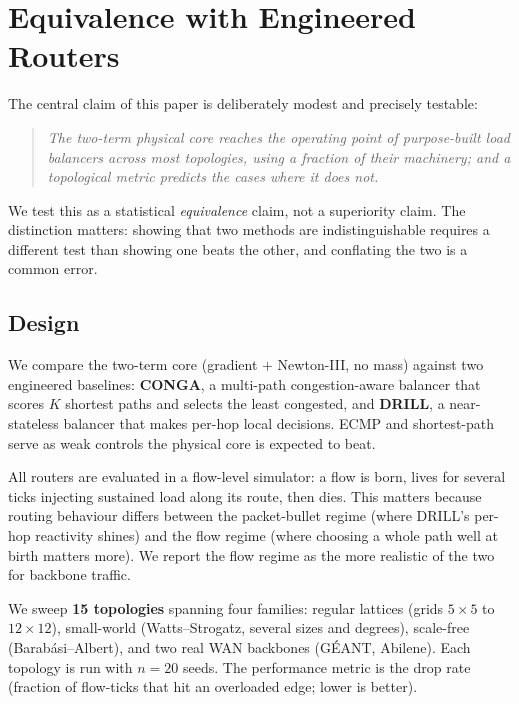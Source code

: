\section{Equivalence with Engineered Routers}
\label{sec:equivalence}

The central claim of this paper is deliberately modest and precisely
testable:

\begin{quote}
\emph{The two-term physical core reaches the operating point of
purpose-built load balancers across most topologies, using a fraction of
their machinery; and a topological metric predicts the cases where it does
not.}
\end{quote}

We test this as a statistical \emph{equivalence} claim, not a superiority
claim. The distinction matters: showing that two methods are
indistinguishable requires a different test than showing one beats the
other, and conflating the two is a common error.

\subsection{Design}
\label{sec:equiv-design}

We compare the two-term core (gradient + Newton-III, no mass) against two
engineered baselines: \textbf{CONGA}, a multi-path congestion-aware balancer
that scores $K$ shortest paths and selects the least congested, and
\textbf{DRILL}, a near-stateless balancer that makes per-hop local decisions.
ECMP and shortest-path serve as weak controls the physical core is expected
to beat.

All routers are evaluated in a flow-level simulator: a flow is born, lives
for several ticks injecting sustained load along its route, then dies. This
matters because routing behaviour differs between the packet-bullet regime
(where DRILL's per-hop reactivity shines) and the flow regime (where choosing
a whole path well at birth matters more). We report the flow regime as the
more realistic of the two for backbone traffic.

We sweep \textbf{15 topologies} spanning four families: regular lattices
(grids $5\times5$ to $12\times12$), small-world (Watts--Strogatz, several
sizes and degrees), scale-free (Barab\'asi--Albert), and two real WAN
backbones (G\'EANT, Abilene). Each topology is run with $n=20$ seeds. The
performance metric is the drop rate (fraction of flow-ticks that hit an
overloaded edge; lower is better).

